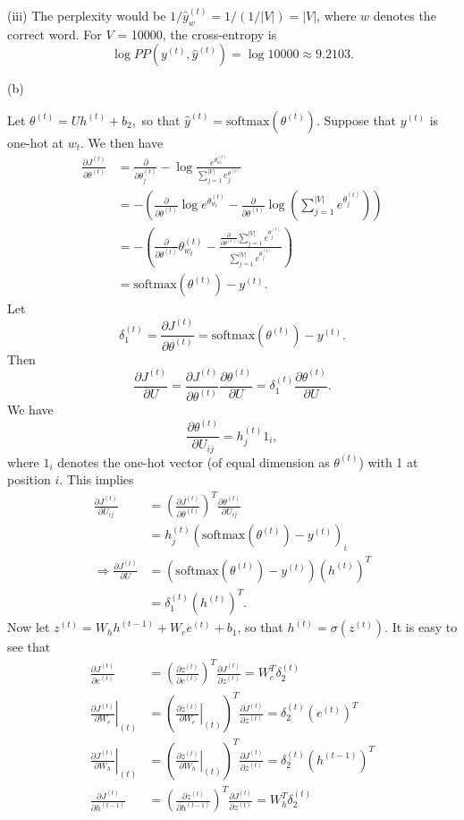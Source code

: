 \documentclass{article}
\newcommand{\pd}[2]{\frac{\partial #1}{\partial #2}}
\begin{document}
(iii) The perplexity would be $1/\hat{y}_w^{(t)} = 1/(1/|V|) = |V|$, where $w$ denotes the correct word. For $V$ = 10000, the cross-entropy is
$$\log PP\left(y^{(t)}, \hat{y}^{(t)}\right) = \log 10000 \approx 9.2103.$$

(b)

Let $\theta^{(t)} = Uh^{(t)} + b_2,$ so that $\hat{y}^{(t)} = \text{softmax}(\theta^{(t)})$. Suppose that $y^{(t)}$ is one-hot at $w_t$. We then have
\begin{align*}
\pd{J^{(t)}}{\theta^{(t)}} &= \pd{}{\theta^{(t)}_j} - \log \frac{e^{\theta^{(t)}_{w_t}}}{\sum_{j=1}^{|V|} e^{\theta^{(t)}}_j} \\
&= - \left( \pd{}{\theta^{(t)}}\log e^{\theta^{(t)}_{w_t}} - \pd{}{\theta^{(t)}} \log\left(\sum_{j=1}^{|V|} e^{\theta^{(t)}_j}\right) \right) \\
&= - \left( \pd{}{\theta^{(t)}} \theta^{(t)}_{w_t} - \frac{\pd{}{\theta^{(t)}} \sum_{j=1}^{|V|} e^{\theta^{(t)}_j}}{\sum_{j=1}^{|V|} e^{\theta^{(t)}_j}}\right) \\
&= \text{softmax}(\theta^{(t)}) - y^{(t)}.
\end{align*}
Let
$$\delta_1^{(t)} = \pd{J^{(t)}}{\theta^{(t)}} = \text{softmax}(\theta^{(t)}) - y^{(t)}.$$
Then
$$\pd{J^{(t)}}{U} = \pd{J^{(t)}}{\theta^{(t)}} \pd{\theta^{(t)}}{U} = \delta_1^{(t)} \pd{\theta^{(t)}}{U}.$$
We have
$$\pd{\theta^{(t)}}{U_{ij}} = h^{(t)}_j1_i,$$
where $1_i$ denotes the one-hot vector (of equal dimension as $\theta^{(t)}$) with 1 at position $i$. This implies
\begin{align*}
\pd{J^{(t)}}{U_{ij}} &= \left(\pd{J^{(t)}}{\theta^{(t)}}\right)^T \pd{\theta^{(t)}}{U_{ij}}\\
&= h^{(t)}_j\left(\text{softmax}(\theta^{(t)}) - y^{(t)}\right)_i \\
\Rightarrow \pd{J^{(t)}}{U} &= \left(\text{softmax}(\theta^{(t)}) - y^{(t)}\right) \left(h^{(t)}\right)^T\\
&= \delta_1^{(t)} \left(h^{(t)}\right)^T.
\end{align*}
Now let $z^{(t)} = W_h h^{(t-1)} + W_e e^{(t)} + b_1$, so that $h^{(t)} = \sigma(z^{(t)}).$ It is easy to see that
\begin{align*}
\pd{J^{(t)}}{e^{(t)}} &= \left(\pd{z^{(t)}}{e^{(t)}}\right)^T \pd{J^{(t)}}{z^{(t)}} = W_e^T\delta_2^{(t)} \\
\left. \pd{J^{(t)}}{W_e} \right|_{(t)} &= \left(\left.\pd{z^{(t)}}{W_e}\right|_{(t)}\right)^T \pd{J^{(t)}}{z^{(t)}} = \delta_2^{(t)}(e^{(t)})^T \\
\left. \pd{J^{(t)}}{W_h}\right|_{(t)} &= \left(\left.\pd{z^{(t)}}{W_h}\right|_{(t)}\right)^T \pd{J^{(t)}}{z^{(t)}} = \delta_2^{(t)}(h^{(t-1)})^T \\
\pd{J^{(t)}}{h^{(t-1)}} &= \left(\pd{z^{(t)}}{h^{(t-1)}}\right)^T \pd{J^{(t)}}{z^{(t)}} = W_h^T\delta_2^{(t)}
\end{align*}
\end{document}
